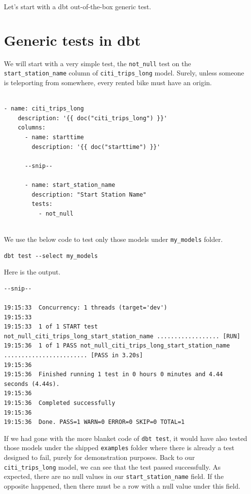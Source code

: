 \documentclass[
]{book}
\begin{document}
Let's start with a dbt out-of-the-box generic test.

\hypertarget{generic-tests-in-dbt}{%
\section{Generic tests in dbt}\label{generic-tests-in-dbt}}

We will start with a very simple test, the \texttt{not\_null} test on the \texttt{start\_station\_name} column of \texttt{citi\_trips\_long} model. Surely, unless someone is teleporting from somewhere, every rented bike must have an origin.

\begin{verbatim}

- name: citi_trips_long
    description: '{{ doc("citi_trips_long") }}'
    columns:
      - name: starttime
        description: '{{ doc("starttime") }}'

      --snip--

      - name: start_station_name
        description: "Start Station Name"
        tests:
          - not_null
          
\end{verbatim}

We use the below code to test only those models under \texttt{my\_models} folder.

\begin{verbatim}
dbt test --select my_models
\end{verbatim}

Here is the output.

\begin{verbatim}
--snip--

19:15:33  Concurrency: 1 threads (target='dev')
19:15:33  
19:15:33  1 of 1 START test not_null_citi_trips_long_start_station_name .................. [RUN]
19:15:36  1 of 1 PASS not_null_citi_trips_long_start_station_name ........................ [PASS in 3.20s]
19:15:36  
19:15:36  Finished running 1 test in 0 hours 0 minutes and 4.44 seconds (4.44s).
19:15:36  
19:15:36  Completed successfully
19:15:36  
19:15:36  Done. PASS=1 WARN=0 ERROR=0 SKIP=0 TOTAL=1
\end{verbatim}

If we had gone with the more blanket code of \texttt{dbt\ test}, it would have also tested those models under the shipped \texttt{examples} folder where there is already a test designed to fail, purely for demonstration purposes. Back to our \texttt{citi\_trips\_long} model, we can see that the test passed successfully. As expected, there are no null values in our \texttt{start\_station\_name} field. If the opposite happened, then there must be a row with a null value under this field.
\end{document}
